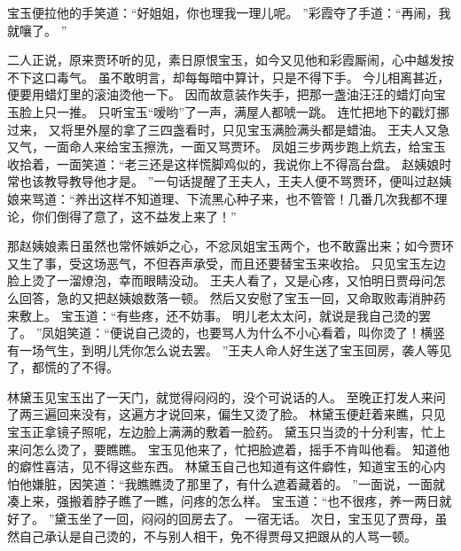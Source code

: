 宝玉便拉他的手笑道：“好姐姐，你也理我一理儿呢。
”彩霞夺了手道：“再闹，我就嚷了。
”\par
二人正说，原来贾环听的见，素日原恨宝玉，如今又见他和彩霞厮闹，心中越发按不下这口毒气。
虽不敢明言，却每每暗中算计，只是不得下手。
今儿相离甚近，便要用蜡灯里的滚油烫他一下。
因而故意装作失手，把那一盏油汪汪的蜡灯向宝玉脸上只一推。
只听宝玉“嗳哟”了一声，满屋人都唬一跳。
连忙把地下的戳灯挪过来，
又将里外屋的拿了三四盏看时，只见宝玉满脸满头都是蜡油。
王夫人又急又气，一面命人来给宝玉擦洗，一面又骂贾环。
凤姐三步两步跑上炕去，给宝玉收拾着，一面笑道：“老三还是这样慌脚鸡似的，我说你上不得高台盘。
赵姨娘时常也该教导教导他才是。
”一句话提醒了王夫人，王夫人便不骂贾环，便叫过赵姨娘来骂道：“养出这样不知道理、下流黑心种子来，也不管管！几番几次我都不理论，你们倒得了意了，这不益发上来了！”\par
那赵姨娘素日虽然也常怀嫉妒之心，不忿凤姐宝玉两个，也不敢露出来；如今贾环又生了事，受这场恶气，不但吞声承受，而且还要替宝玉来收拾。
只见宝玉左边脸上烫了一溜燎泡，幸而眼睛没动。
王夫人看了，又是心疼，又怕明日贾母问怎么回答，急的又把赵姨娘数落一顿。
然后又安慰了宝玉一回，又命取败毒消肿药来敷上。
宝玉道：“有些疼，还不妨事。
明儿老太太问，就说是我自己烫的罢了。
”凤姐笑道：“便说自己烫的，也要骂人为什么不小心看着，叫你烫了！横竖有一场气生，到明儿凭你怎么说去罢。
”王夫人命人好生送了宝玉回房，袭人等见了，都慌的了不得。
\par
林黛玉见宝玉出了一天门，就觉得闷闷的，没个可说话的人。
至晚正打发人来问了两三遍回来没有，这遍方才说回来，偏生又烫了脸。
林黛玉便赶着来瞧，只见宝玉正拿镜子照呢，左边脸上满满的敷着一脸药。
黛玉只当烫的十分利害，忙上来问怎么烫了，要瞧瞧。
宝玉见他来了，忙把脸遮着，摇手不肯叫他看。
知道他的癖性喜洁，见不得这些东西。
林黛玉自己也知道有这件癖性，知道宝玉的心内怕他嫌脏，因笑道：“我瞧瞧烫了那里了，有什么遮着藏着的。
”一面说，一面就凑上来，强搬着脖子瞧了一瞧，问疼的怎么样。
宝玉道：“也不很疼，养一两日就好了。
”黛玉坐了一回，闷闷的回房去了。
一宿无话。
次日，宝玉见了贾母，虽然自己承认是自己烫的，不与别人相干，免不得贾母又把跟从的人骂一顿。
